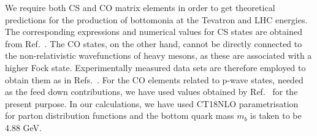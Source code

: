 We require both CS and CO matrix elements in order to get theoretical
predictions for the production of bottomonia at the Tevatron and LHC energies.
The corresponding expressions and
numerical values for CS states are obtained from Ref.~\cite{Braaten:2000cm}.
The CO states, on the other hand, cannot be directly connected to the non-relativistic
wavefunctions of heavy mesons,
as these are associated with a higher Fock state. Experimentally measured data sets are 
therefore employed to obtain them as in Refs.~\cite{Braaten:2000cm,Cho:1995vh,Cho:1995ce}. 
For the CO elements related to p-wave states, needed as the 
feed down contributions, we have used values obtained by Ref.~\cite{Sharma:2012dy,Feng:2015wka} for the 
present purpose. In our calculations, we have used
CT18NLO parametrisation~\cite{Hou:2019efy} for parton distribution functions and 
the bottom quark mass $m_b$ is taken to be 4.88 GeV.


